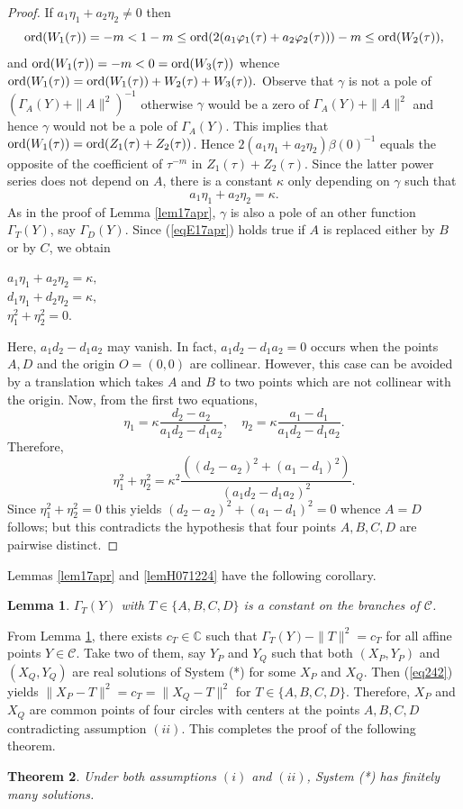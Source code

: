 \documentclass[10pt]{amsart}
\newtheorem{thm}{Theorem}[section]
\newtheorem{lem}[thm]{Lemma}
\theoremstyle{definition}
\theoremstyle{remark}
\def\cC{\mathcal C}
\begin{document}
\begin{proof}
If $a_1\eta_1+a_2\eta_2\neq 0$ then
$${\rm{ord}}(W_1(\tau))=-m<1-m\le{\rm{ord}}(2(a_1\varphi_1(\tau)+a_2\varphi_2(\tau)))-m\leq {\rm{ord}}(W_2(\tau)),$$ and ${\rm{ord}}(W_1(\tau))=-m<0={\rm{ord}}(W_3(\tau))$ whence ${\rm{ord}}(W_1(\tau))={\rm{ord}}(W_1(\tau))+W_2(\tau)+W_3(\tau)).$  Observe that $\gamma$ is not a pole of $(\Gamma_A(Y)+\|A\|^2)^{-1}$
otherwise $\gamma$ would be a zero of $\Gamma_A(Y)+\|A\|^2$ and hence $\gamma$ would not be a pole of $\Gamma_A(Y)$.
This implies that ${\rm{ord}}(W_1(\tau))={\rm{ord}}(Z_1(\tau)+Z_2(\tau))$. Hence
$2(a_1\eta_1+a_2\eta_2)\beta(0)^{-1}$ equals the opposite of the coefficient of $\tau^{-m}$ in $Z_1(\tau)+Z_2(\tau)$. Since the latter power series does not depend on $A$, there is a constant $\kappa$ only depending on $\gamma$ such that
\begin{equation}
\label{eqE17apr} a_1\eta_1+a_2\eta_2=\kappa.
\end{equation}
As in the proof of Lemma \ref{lem17apr}, $\gamma$ is also a pole of an other function $\Gamma_T(Y)$, say $\Gamma_D(Y)$. Since (\ref{eqE17apr}) holds true if $A$ is replaced either by $B$ or by $C$, we obtain

\begin{center}
$a_1\eta_1+a_2\eta_2=\kappa,$\\
$d_1\eta_1+d_2\eta_2=\kappa,$\\
$\eta_1^2+\eta_2^2=0.$
\end{center}

Here, $a_1d_2-d_1a_2$ may vanish. In fact, $a_1d_2-d_1a_2=0$ occurs when the points $A,D$ and the origin $O=(0,0)$ are collinear. However, this case can be avoided by a translation which takes $A$ and $B$ to two points which are not collinear with the origin.  Now, from the first two equations,
$$\eta_1=\kappa \frac{d_2-a_2}{a_1d_2-d_1a_2},\quad \eta_2=\kappa \frac{a_1-d_1}{a_1d_2-d_1a_2}.$$
Therefore,
\[
\eta_1^2+\eta_2^2=\kappa^2\frac{{((d_2-a_2)^2+(a_1-d_1)^2)}}{{(a_1d_2-d_1a_2)^2}}.
\]
Since $\eta_1^2+\eta_2^2=0$ this yields $(d_2-a_2)^2+(a_1-d_1)^2=0$ whence $A=D$ follows; but this contradicts the hypothesis that four points $A,B,C,D$ are pairwise distinct.
\end{proof}
Lemmas \ref{lem17apr} and \ref{lemH071224} have the following corollary.
\begin{lem}
\label{prop19apr} $\Gamma_T(Y)$ with $T\in \{A,B,C,D\}$ is a constant on the branches of $\cC$.
\end{lem}
From Lemma \ref{prop19apr}, there exists $c_T\in \mathbb{C}$ such that $\Gamma_T(Y)-\|T\|^2=c_T$ for all  affine points $Y\in \cC$.
Take two of them, say $Y_P$ and $Y_Q$ such that both $(X_P,Y_P)$ and $(X_Q,Y_Q)$ are real solutions of System (*) for some $X_P$ and $X_Q$. Then (\ref{eq242}) yields $\|X_P-T\|^2=c_T=\|X_Q-T\|^2$ for $T\in \{A,B,C,D\}$.
Therefore, $X_P$ and $X_Q$ are common points of four circles with centers at the points $A,B,C,D$ contradicting assumption $(ii)$.
This completes the proof of the following theorem.
\begin{thm}
\label{prop081224}
Under both assumptions $(i)$ and $(ii)$, System (*) has finitely many solutions.
\end{thm}
\end{document}
